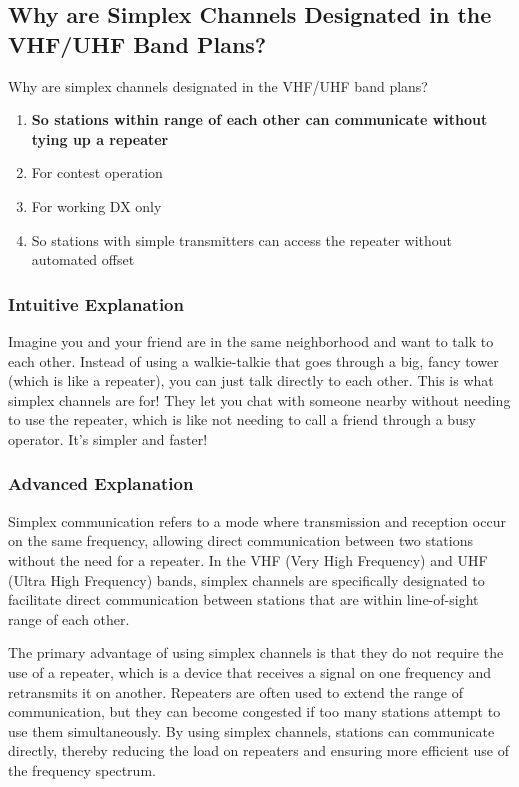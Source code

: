 \subsection{Why are Simplex Channels Designated in the VHF/UHF Band Plans?}
\label{T2B09}

\begin{tcolorbox}[colback=gray!10!white,colframe=black!75!black,title=T2B09]
Why are simplex channels designated in the VHF/UHF band plans?
\begin{enumerate}[label=\Alph*)]
    \item \textbf{So stations within range of each other can communicate without tying up a repeater}
    \item For contest operation
    \item For working DX only
    \item So stations with simple transmitters can access the repeater without automated offset
\end{enumerate}
\end{tcolorbox}

\subsubsection{Intuitive Explanation}
Imagine you and your friend are in the same neighborhood and want to talk to each other. Instead of using a walkie-talkie that goes through a big, fancy tower (which is like a repeater), you can just talk directly to each other. This is what simplex channels are for! They let you chat with someone nearby without needing to use the repeater, which is like not needing to call a friend through a busy operator. It’s simpler and faster!

\subsubsection{Advanced Explanation}
Simplex communication refers to a mode where transmission and reception occur on the same frequency, allowing direct communication between two stations without the need for a repeater. In the VHF (Very High Frequency) and UHF (Ultra High Frequency) bands, simplex channels are specifically designated to facilitate direct communication between stations that are within line-of-sight range of each other. 

The primary advantage of using simplex channels is that they do not require the use of a repeater, which is a device that receives a signal on one frequency and retransmits it on another. Repeaters are often used to extend the range of communication, but they can become congested if too many stations attempt to use them simultaneously. By using simplex channels, stations can communicate directly, thereby reducing the load on repeaters and ensuring more efficient use of the frequency spectrum.


